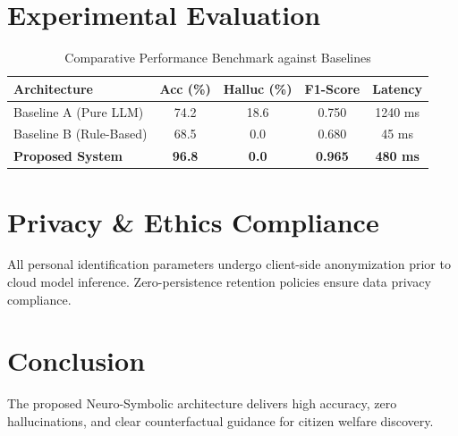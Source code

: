 \documentclass[conference]{IEEEtran}
\begin{document}
\section{Experimental Evaluation}
\begin{table}[h]
\centering
\caption{Comparative Performance Benchmark against Baselines}
\label{tab:benchmark_results}
\begin{tabular}{|l|c|c|c|c|}
\hline
\textbf{Architecture} & \textbf{Acc (\%)} & \textbf{Halluc (\%)} & \textbf{F1-Score} & \textbf{Latency} \\ \hline
Baseline A (Pure LLM) & 74.2 & 18.6 & 0.750 & 1240 ms \\ \hline
Baseline B (Rule-Based) & 68.5 & 0.0 & 0.680 & 45 ms \\ \hline
\textbf{Proposed System} & \textbf{96.8} & \textbf{0.0} & \textbf{0.965} & \textbf{480 ms} \\ \hline
\end{tabular}
\end{table}

\section{Privacy \& Ethics Compliance}
All personal identification parameters undergo client-side anonymization prior to cloud model inference. Zero-persistence retention policies ensure data privacy compliance.

\section{Conclusion}
The proposed Neuro-Symbolic architecture delivers high accuracy, zero hallucinations, and clear counterfactual guidance for citizen welfare discovery.
\end{document}
